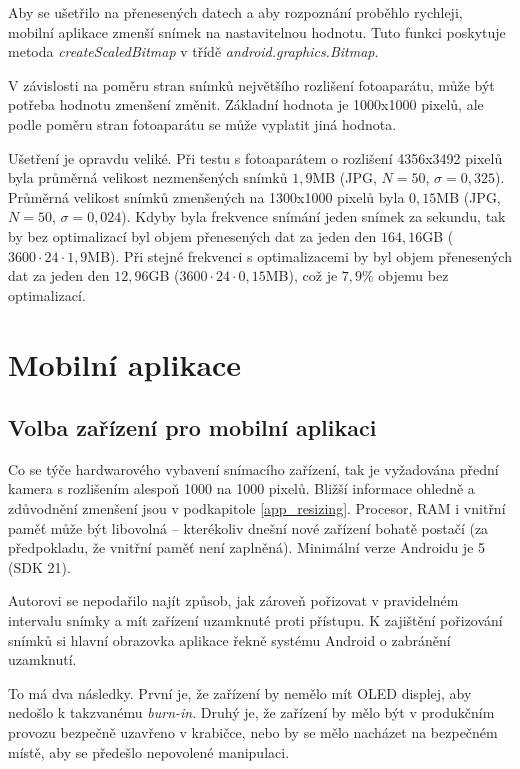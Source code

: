 \noindent
Aby se ušetřilo na přenesených datech a aby rozpoznání proběhlo rychleji,
mobilní aplikace zmenší snímek
na nastavitelnou hodnotu.
Tuto funkci poskytuje metoda \textit{createScaledBitmap} v třídě \textit{android.graphics.Bitmap}.

V závislosti na poměru stran snímků největšího rozlišení fotoaparátu,
může být potřeba hodnotu zmenšení změnit.
Základní hodnota je 1000x1000 pixelů, ale podle poměru stran fotoaparátu se může vyplatit
jiná hodnota.

Ušetření je opravdu veliké. Při testu s fotoaparátem o rozlišení 4356x3492 pixelů
byla průměrná velikost nezmenšených snímků $1,9$MB (JPG, $N=50$, $\sigma=0,325$).
Průměrná velikost snímků zmenšených na 1300x1000 pixelů byla
$0,15$MB (JPG, $N=50$, $\sigma=0,024$). Kdyby byla frekvence snímání jeden snímek za sekundu,
tak by bez optimalizací byl objem přenesených dat za jeden den $164,16$GB ($3600\cdot24\cdot1,9$MB).
Při stejné frekvenci s optimalizacemi by byl objem přenesených dat za jeden den
$12,96$GB ($3600\cdot24\cdot0,15$MB), což je $7,9$\% objemu bez optimalizací.

\section{Mobilní aplikace}

\subsection{Volba zařízení pro mobilní aplikaci}

\noindent
Co se týče hardwarového vybavení snímacího zařízení, tak je vyžadována přední kamera
s rozlišením alespoň 1000 na 1000 pixelů. Bližší informace ohledně a zdůvodnění zmenšení jsou v podkapitole \ref{app_resizing}.
Procesor, RAM i vnitřní paměť může být libovolná -- kterékoliv
dnešní nové zařízení bohatě postačí (za předpokladu, že vnitřní paměť není zaplněná).
Minimální verze Androidu je 5 (SDK 21).

Autorovi se nepodařilo najít způsob, jak zároveň pořizovat v pravidelném intervalu snímky
a mít zařízení uzamknuté proti přístupu. K zajištění pořizování snímků si hlavní
obrazovka aplikace řekně systému Android o zabránění uzamknutí.

To má dva následky. První je, že zařízení by nemělo mít OLED displej, aby nedošlo k takzvanému
\textit{burn-in}. \citep[][]{OledBurnIn} Druhý je, že zařízení by mělo být v produkčním provozu
bezpečně uzavřeno v krabičce, nebo by se mělo nacházet na bezpečném místě, aby se předešlo
nepovolené manipulaci.

